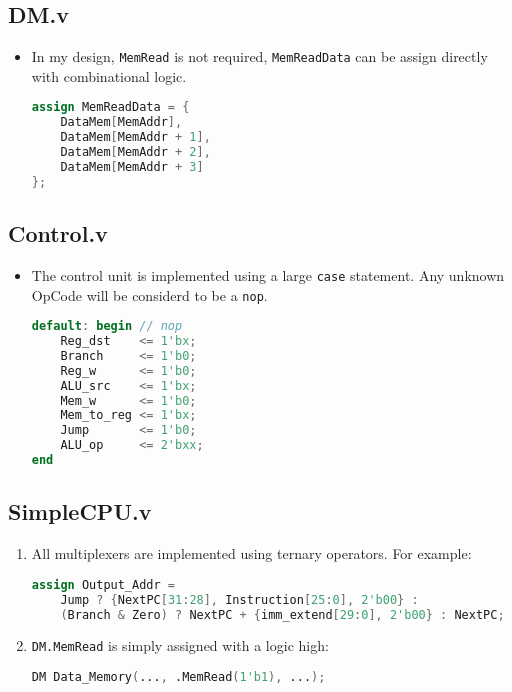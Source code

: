 \documentclass[12pt]{article}
\begin{document}
\subsection{DM.v}
\begin{itemize}
    \item In my design, \texttt{MemRead} is not required, \texttt{MemReadData} can be assign directly with combinational logic.
    \begin{lstlisting}[language=Verilog]
assign MemReadData = {
    DataMem[MemAddr], 
    DataMem[MemAddr + 1], 
    DataMem[MemAddr + 2], 
    DataMem[MemAddr + 3]
};
    \end{lstlisting}
\end{itemize}

\subsection{Control.v}
\begin{itemize}
    \item The control unit is implemented using a large \texttt{case} statement. Any unknown OpCode will be considerd to be a \texttt{nop}.
    \begin{lstlisting}[language=Verilog]
default: begin // nop
    Reg_dst    <= 1'bx;
    Branch     <= 1'b0;
    Reg_w      <= 1'b0;
    ALU_src    <= 1'bx;
    Mem_w      <= 1'b0;
    Mem_to_reg <= 1'bx;
    Jump       <= 1'b0;
    ALU_op     <= 2'bxx;
end
    \end{lstlisting}
\end{itemize}

\subsection{SimpleCPU.v}
\begin{enumerate}
    \item All multiplexers are implemented using ternary operators. For example:
    \begin{lstlisting}[language=Verilog]
assign Output_Addr = 
    Jump ? {NextPC[31:28], Instruction[25:0], 2'b00} :
    (Branch & Zero) ? NextPC + {imm_extend[29:0], 2'b00} : NextPC;
    \end{lstlisting}
    \item \texttt{DM.MemRead} is simply assigned with a logic high:
    \begin{lstlisting}[language=Verilog]
DM Data_Memory(..., .MemRead(1'b1), ...);
    \end{lstlisting}
\end{enumerate}
\end{document}
